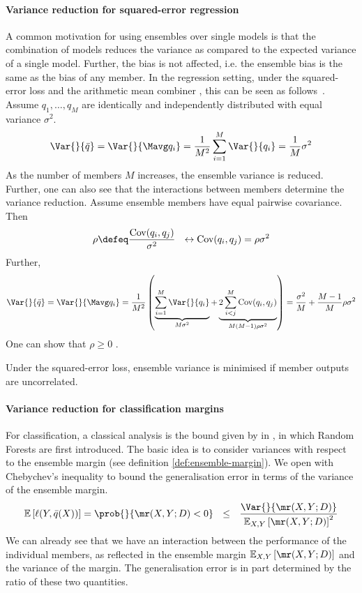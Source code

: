 \documentclass[
    a4paper, %
	fontsize=10pt, %
	twoside=false, %
]{kaobook}
\begin{document}
\paragraph{Variance reduction for squared-error regression} 
A common motivation for using ensembles over single models is that the combination of models reduces the variance as compared to the expected variance of a single model. Further, the bias is not affected, i.e. the ensemble bias is the same as the bias of any member.
In the regression setting, under the squared-error loss and the arithmetic mean combiner%
, this can be seen as follows~\cite{stackexchange}. Assume $q_{1}, \dots, q_{M}$ are identically and independently distributed with equal variance $\sigma^2$.
$$
	\Var{}{\bar{q}} = \Var{}{\Mavg q_{i}} = \frac{1}{M^2} \sum_{i=1}^M \Var{}{q_{i}} = \frac{1}{M} \sigma^2
$$
As the number of members $M$ increases, the ensemble variance is reduced. Further, one can also see that the interactions between members determine the variance reduction. Assume ensemble members have equal pairwise covariance. Then 
$$
\rho \defeq \frac{\text{Cov}(q_{i}, q_{j})}{\sigma^2} ~ ~ \leftrightarrow \text{Cov}(q_{i}, q_{j}) = \rho \sigma^2
$$
Further, 
$$
\Var{}{\bar{q}} = \Var{}{\Mavg q_{i}} = \frac{1}{M^2} \left( 
\underbrace{
\sum_{i=1}^M \Var{}{q_{i}}
}_{M\sigma^2}
+
\underbrace{
2 \sum_{i<j}^M \text{Cov}(q_{i}, q_{j})
}_{M(M-1)\rho \sigma^2}
\right)
= \frac{\sigma^2}{M} + \frac{M-1}{M} \rho \sigma^2
$$
One can show that $\rho \geq 0$ \cite{louppe_UnderstandingRandomForests_2015}. 
\begin{corollary}
  Under the squared-error loss, ensemble variance is minimised if member outputs are uncorrelated.
\end{corollary}

\paragraph{Variance reduction for classification margins} For classification, a classical analysis is the bound given by \citeauthor{breiman_RandomForests_2001} in \cite{breiman_RandomForests_2001}, in which Random Forests are first introduced. The basic idea is to consider variances with respect to the ensemble margin (see definition \ref{def:ensemble-margin}).
We open with Chebychev's inequality to bound the generalisation error in terms of the variance of the ensemble margin.
$$
\mathbb{E}\left[ \ell(Y, \bar{q}(X)) \right]  = \prob{}{\mr(X, Y; D) < 0 }  ~ ~ \leq ~ ~ \frac{\Var{}{\mr(X, Y; D)  }}{\mathbb{E}_{X,Y}\left[ \mr(X, Y; D)  \right]^2}
$$
We can already see that we have an interaction between the performance of the individual members, as reflected in the ensemble margin $\mathbb{E}_{X,Y}\left[ \mr(X, Y; D)  \right]$ and the variance of the margin.
The generalisation error is in part determined by the ratio of these two quantities.
\end{document}
